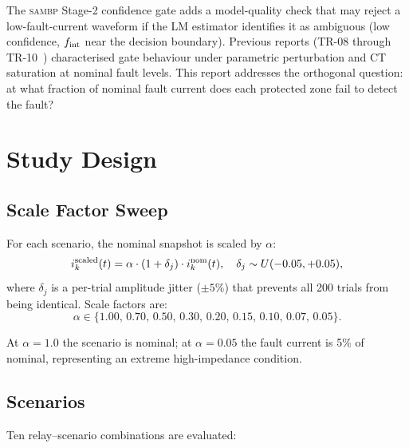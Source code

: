 \documentclass[12pt,a4paper]{article}
\newcommand{\SAMBP}{\textsc{sambp}}
\newcommand{\fint}{f_{\rm int}}
\begin{document}
The \SAMBP{} Stage-2 confidence gate adds a model-quality check that may
reject a low-fault-current waveform if the LM estimator identifies it as
ambiguous (low confidence, $\fint$ near the decision boundary).  Previous
reports (TR-08 through TR-10~\citep{SAMBP_TR09,SAMBP_TR10}) characterised
gate behaviour under parametric perturbation and CT saturation at nominal
fault levels.  This report addresses the orthogonal question: at what
fraction of nominal fault current does each protected zone fail to detect
the fault?

\section{Study Design}

\subsection{Scale Factor Sweep}

For each scenario, the nominal snapshot is scaled by $\alpha$:
\begin{equation}
  i_k^{\rm scaled}(t) = \alpha \cdot (1+\delta_j) \cdot i_k^{\rm nom}(t),
  \quad \delta_j \sim U(-0.05,+0.05),
  \label{eq:scale}
\end{equation}
where $\delta_j$ is a per-trial amplitude jitter ($\pm5\%$) that
prevents all 200 trials from being identical.  Scale factors are:
\begin{equation}
  \alpha \in \{1.00,\,0.70,\,0.50,\,0.30,\,0.20,\,0.15,\,0.10,\,0.07,\,0.05\}.
\end{equation}

At $\alpha = 1.0$ the scenario is nominal; at $\alpha = 0.05$ the
fault current is 5\% of nominal, representing an extreme high-impedance
condition.

\subsection{Scenarios}

Ten relay--scenario combinations are evaluated:
\end{document}

